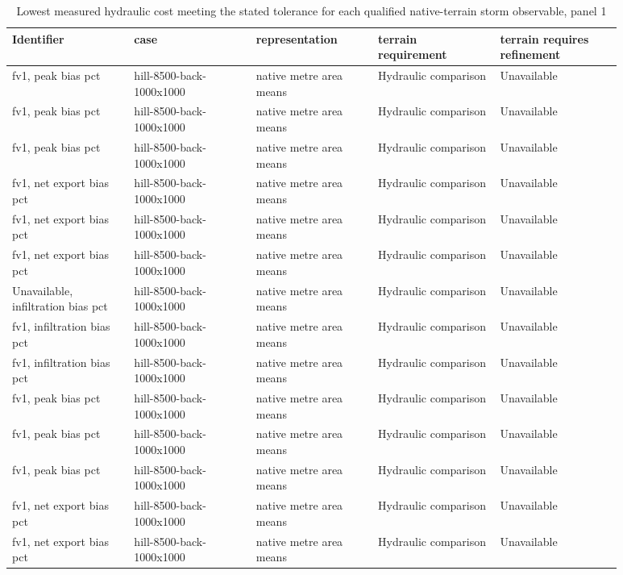 \begingroup
\small
\setlength{\tabcolsep}{2pt}
\begin{longtable}{p{0.1760\linewidth}p{0.1760\linewidth}p{0.1760\linewidth}p{0.1760\linewidth}p{0.1760\linewidth}}
\caption{Lowest measured hydraulic cost meeting the stated tolerance for each qualified native-terrain storm observable, panel 1}\\
\hline
Identifier & case & representation & terrain requirement & terrain requires refinement \\
\hline\endhead
fv1, peak bias pct & hill-8500-back-1000x1000 & native metre area means & Hydraulic comparison & Unavailable \\
fv1, peak bias pct & hill-8500-back-1000x1000 & native metre area means & Hydraulic comparison & Unavailable \\
fv1, peak bias pct & hill-8500-back-1000x1000 & native metre area means & Hydraulic comparison & Unavailable \\
fv1, net export bias pct & hill-8500-back-1000x1000 & native metre area means & Hydraulic comparison & Unavailable \\
fv1, net export bias pct & hill-8500-back-1000x1000 & native metre area means & Hydraulic comparison & Unavailable \\
fv1, net export bias pct & hill-8500-back-1000x1000 & native metre area means & Hydraulic comparison & Unavailable \\
Unavailable, infiltration bias pct & hill-8500-back-1000x1000 & native metre area means & Hydraulic comparison & Unavailable \\
fv1, infiltration bias pct & hill-8500-back-1000x1000 & native metre area means & Hydraulic comparison & Unavailable \\
fv1, infiltration bias pct & hill-8500-back-1000x1000 & native metre area means & Hydraulic comparison & Unavailable \\
fv1, peak bias pct & hill-8500-back-1000x1000 & native metre area means & Hydraulic comparison & Unavailable \\
fv1, peak bias pct & hill-8500-back-1000x1000 & native metre area means & Hydraulic comparison & Unavailable \\
fv1, peak bias pct & hill-8500-back-1000x1000 & native metre area means & Hydraulic comparison & Unavailable \\
fv1, net export bias pct & hill-8500-back-1000x1000 & native metre area means & Hydraulic comparison & Unavailable \\
fv1, net export bias pct & hill-8500-back-1000x1000 & native metre area means & Hydraulic comparison & Unavailable \\

\end{longtable}
